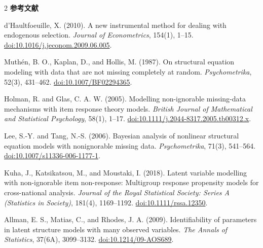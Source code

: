 \documentclass[a4paper,10pt]{article}
\begin{document}
\begin{multicols}{2}
\vspace{0.2mm}
\noindent\textbf{\scriptsize 参考文献}
\begin{enumerate}[label={[\arabic*]},leftmargin=4mm,itemsep=0pt,topsep=0pt,
  parsep=0pt,partopsep=0pt]
\fontsize{4.3}{4.5}\selectfont
\item d'Haultfoeuille, X. (2010). A new instrumental method for dealing with
endogenous selection. \textit{Journal of Econometrics}, 154(1), 1--15.
\href{https://doi.org/10.1016/j.jeconom.2009.06.005}{doi:10.1016/j.jeconom.2009.06.005}.
\item Muth\'en, B. O., Kaplan, D., and Hollis, M. (1987). On structural
equation modeling with data that are not missing completely at random.
\textit{Psychometrika}, 52(3), 431--462.
\href{https://doi.org/10.1007/BF02294365}{doi:10.1007/BF02294365}.
\item Holman, R. and Glas, C. A. W. (2005). Modelling non-ignorable
missing-data mechanisms with item response theory models. \textit{British
Journal of Mathematical and Statistical Psychology}, 58(1), 1--17.
\href{https://doi.org/10.1111/j.2044-8317.2005.tb00312.x}{doi:10.1111/j.2044-8317.2005.tb00312.x}.
\item Lee, S.-Y. and Tang, N.-S. (2006). Bayesian analysis of nonlinear
structural equation models with nonignorable missing data.
\textit{Psychometrika}, 71(3), 541--564.
\href{https://doi.org/10.1007/s11336-006-1177-1}{doi:10.1007/s11336-006-1177-1}.
\item Kuha, J., Katsikatsou, M., and Moustaki, I. (2018). Latent variable
modelling with non-ignorable item non-response: Multigroup response propensity
models for cross-national analysis. \textit{Journal of the Royal Statistical
Society: Series A (Statistics in Society)}, 181(4), 1169--1192.
\href{https://doi.org/10.1111/rssa.12350}{doi:10.1111/rssa.12350}.
\item Allman, E. S., Matias, C., and Rhodes, J. A. (2009). Identifiability of
parameters in latent structure models with many observed variables.
\textit{The Annals of Statistics}, 37(6A), 3099--3132.
\href{https://doi.org/10.1214/09-AOS689}{doi:10.1214/09-AOS689}.
\end{enumerate}

\end{multicols}
\end{document}
